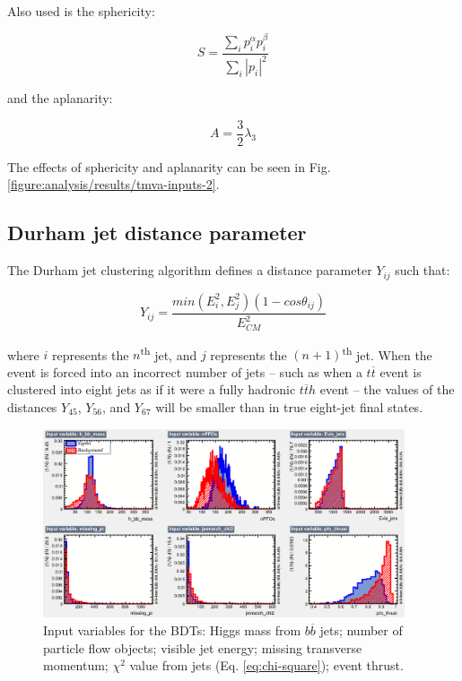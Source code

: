 Also used is the sphericity:

\begin{equation}
	S = \frac{\sum_i p_i^{\alpha} p_i^{\beta}}{\sum_i | p_i |^2}
\label{eq:sphericity}
\end{equation}

and the aplanarity:

\begin{equation}
	A = \frac{3}{2}\lambda_3
\label{eq:aplanarity}
\end{equation}

The effects of sphericity and aplanarity can be seen in Fig. \ref{figure:analysis/results/tmva-inputs-2}.

\subsection{Durham jet distance parameter}
The Durham jet clustering algorithm defines a distance parameter $Y_{ij}$ such that:

\begin{equation}
	Y_{ij} = \frac{min(E_i^2 , E_j^2)(1-cos\theta_{ij})}{E^2_{CM}}
\label{eq:durham-distance}
\end{equation}

where $i$ represents the $n$\textsuperscript{th} jet, and $j$ represents the $(n+1)$\textsuperscript{th} jet. When the event is forced into an incorrect number of jets -- such as when a $t\overline{t}$ event is clustered into eight jets as if it were a fully hadronic $t\overline{t}h$ event -- the values of the distances $Y_{45}$, $Y_{56}$, and $Y_{67}$ will be smaller than in true eight-jet final states. 

\begin{figure}[p]
	\centering
	\includegraphics[width=0.95\textwidth]{../Pictures/Analysis/BDTs/variables_id_c1.eps}
	\caption{Input variables for the BDTs: Higgs mass from $b\overline{b}$ jets; number of particle flow objects; visible jet energy; missing transverse momentum; $\chi^2$ value from jets (Eq. \ref{eq:chi-square}); event thrust.}
	\label{figure:analysis/results/tmva-inputs-1}
\end{figure}

